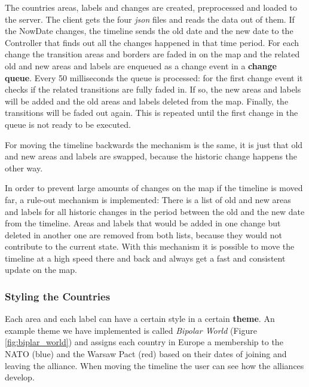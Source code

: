 The countries areas, labels and changes are created, preprocessed and loaded to the server. The client gets the four \textit{json} files and reads the data out of them. If the NowDate changes, the timeline sends the old date and the new date to the Controller that finds out all the changes happened in that time period. For each change the transition areas and borders are faded in on the map and the related old and new areas and labels are enqueued as a change event in a \textbf{change queue}. Every 50 milliseconds the queue is processed: for the first change event it checks if the related transitions are fully faded in. If so, the new areas and labels will be added and the old areas and labels deleted from the map. Finally, the transitions will be faded out again. This is repeated until the first change in the queue is not ready to be executed.

For moving the timeline backwards the mechanism is the same, it is just that old and new areas and labels are swapped, because the historic change happens the other way.

In order to prevent large amounts of changes on the map if the timeline is moved far, a rule-out mechanism is implemented: There is a list of old and new areas and labels for all historic changes in the period between the old and the new date from the timeline. Areas and labels that would be added in one change but deleted in another one are removed from both lists, because they would not contribute to the current state. With this mechanism it is possible to move the timeline at a high speed there and back and always get a fast and consistent update on the map.


\subsubsection{Styling the Countries} %
\label{ssub:styling_the_countries}

Each area and each label can have a certain style in a certain \textbf{theme}. An example theme we have implemented is called \textit{Bipolar World} (Figure \ref{fig:biplar_world}) and assigns each country in Europe a membership to the NATO (blue) and the Warsaw Pact (red) based on their dates of joining and leaving the alliance. When moving the timeline the user can see how the alliances develop.

